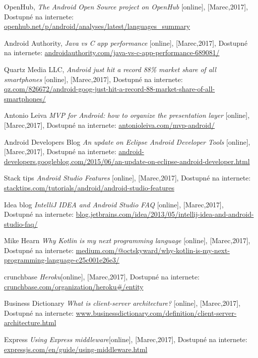 \begin{thebibliography}{99}
OpenHub, \textit{The Android Open Source project on OpenHub} [online], [Marec,2017], Dostupné na internete: 
\url{openhub.net/p/android/analyses/latest/languages_summary}


Android Authority, \textit{Java vs C app performance} [online], [Marec,2017], Dostupné na internete: 
\url{androidauthority.com/java-vs-c-app-performance-689081/}

Quartz Media LLC, \textit{Android just hit a record 88\% market share of all smartphones} [online], [Marec,2017], Dostupné na internete: 
\url{qz.com/826672/android-goog-just-hit-a-record-88-market-share-of-all-smartphones/}


Antonio Leiva \textit{MVP for Android: how to organize the presentation layer} [online], [Marec,2017], Dostupné na internete: 
\url{antonioleiva.com/mvp-android/}


Android Developers Blog \textit{An update on Eclipse Android Developer Tools} [online], [Marec,2017], Dostupné na internete: 
\url{android-developers.googleblog.com/2015/06/an-update-on-eclipse-android-developer.html}

Stack tips
 \textit{Android Studio Features} [online], [Marec,2017], Dostupné na internete: 
\url{stacktips.com/tutorials/android/android-studio-features}

Idea blog \textit{IntelliJ IDEA and Android Studio FAQ} [online], [Marec,2017], Dostupné na internete: 
\url{blog.jetbrains.com/idea/2013/05/intellij-idea-and-android-studio-faq/}
 
Mike Hearn \textit{Why Kotlin is my next programming language} [online], [Marec,2017], Dostupné na internete: 
\url{ medium.com/@octskyward/why-kotlin-is-my-next-programming-language-c25c001e26e3/}
 
crunchbase \textit{Heroku}[online], [Marec,2017], Dostupné na internete: 
\url{ crunchbase.com/organization/heroku#/entity}

Business Dictionary
 \textit{What is client-server architecture?    }[online], [Marec,2017], Dostupné na internete: 
\url{www.businessdictionary.com/definition/client-server-architecture.html }


Express
 \textit{Using Express middleware}[online], [Marec,2017], Dostupné na internete: 
\url{expressjs.com/en/guide/using-middleware.html }
 


\end{thebibliography}
